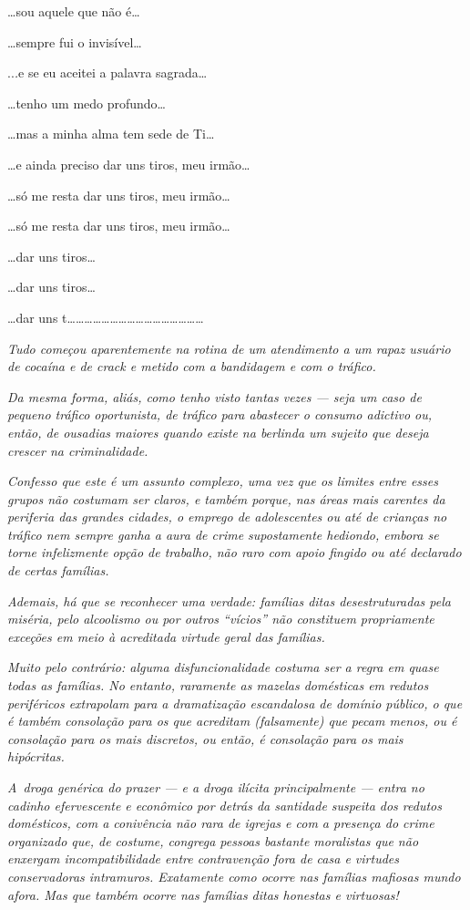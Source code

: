 …sou aquele que não é…

…sempre fui o invisível…

..\emph{.}e se eu aceitei a palavra sagrada…

…tenho um medo profundo…

…mas a minha alma tem sede de Ti…

…e ainda preciso dar uns tiros, meu irmão…

…só me resta dar uns tiros, meu irmão…

…só me resta dar uns tiros, meu irmão…

…dar uns tiros…

…dar uns tiros…

…dar uns
t…………………………………………

\begin{center}\asterisc{}\end{center}


\emph{Tudo começou aparentemente na rotina de um atendimento a um rapaz
usuário de cocaína e de crack e metido com a bandidagem e com o
tráfico.}~

\emph{Da mesma forma, aliás, como tenho visto tantas vezes --- seja um
caso de pequeno tráfico oportunista, de tráfico para abastecer o consumo
adictivo ou, então, de ousadias maiores quando existe na berlinda um
sujeito que deseja crescer na criminalidade.}~

\emph{Confesso que este é um assunto complexo, uma vez que os limites
entre esses grupos não costumam ser claros, e também porque, nas áreas
mais carentes da periferia das grandes cidades, o emprego de
adolescentes ou até de crianças no tráfico nem sempre ganha a aura de
crime supostamente hediondo, embora se torne infelizmente opção de
trabalho, não raro com apoio fingido ou até declarado de certas
famílias.}~

\emph{Ademais, há que se reconhecer uma verdade: famílias ditas
desestruturadas pela miséria, pelo alcoolismo ou por outros ``vícios''
não constituem propriamente exceções em meio à acreditada virtude geral
das famílias.}~

\emph{Muito pelo contrário: alguma disfuncionalidade costuma ser a regra
em quase todas as famílias. No entanto, raramente as mazelas domésticas
em redutos periféricos extrapolam para a dramatização escandalosa de
domínio público, o que é também consolação para os que acreditam
(falsamente) que pecam menos, ou é consolação para os mais discretos, ou
então, é consolação para os mais hipócritas.}~

\emph{A~droga genérica do prazer --- e a droga ilícita principalmente
--- entra no cadinho efervescente e econômico por detrás da santidade
suspeita dos redutos domésticos, com a conivência não rara de igrejas e
com a presença do crime organizado que, de costume, congrega pessoas
bastante moralistas que não enxergam incompatibilidade entre
contravenção fora de casa e virtudes conservadoras intramuros.
Exatamente como ocorre nas famílias mafiosas mundo afora. Mas que também
ocorre nas famílias ditas honestas e virtuosas!}

